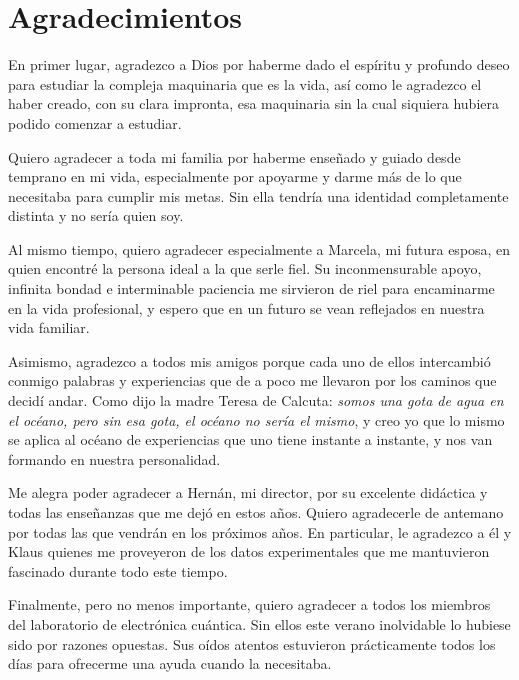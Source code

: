 \chapter*{Agradecimientos}

En primer lugar, agradezco a Dios por haberme dado el espíritu y profundo deseo para estudiar la compleja maquinaria que es la vida, así como le agradezco el haber creado, con su clara impronta, esa maquinaria sin la cual siquiera hubiera podido comenzar a estudiar.

Quiero agradecer a toda mi familia por haberme enseñado y guiado desde temprano en mi vida, especialmente por apoyarme y darme más de lo que necesitaba para cumplir mis metas. Sin ella tendría una identidad completamente distinta y no sería quien soy. 

Al mismo tiempo, quiero agradecer especialmente a Marcela, mi futura esposa, en quien encontré la persona ideal a la que serle fiel. Su inconmensurable apoyo, infinita bondad e interminable paciencia me sirvieron de riel para encaminarme en la vida profesional, y espero que en un futuro se vean reflejados en nuestra vida familiar.

Asimismo, agradezco a todos mis amigos porque cada uno de ellos intercambió conmigo palabras y experiencias que de a poco me llevaron por los caminos que decidí andar. Como dijo la madre Teresa de Calcuta: \textit{somos una gota de agua en el océano, pero sin esa gota, el océano no sería el mismo}, y creo yo que lo mismo se aplica al océano de experiencias que uno tiene instante a instante, y nos van formando en nuestra personalidad.

Me alegra poder agradecer a Hernán, mi director, por su excelente didáctica y todas las enseñanzas que me dejó en estos años. Quiero agradecerle de antemano por todas las que vendrán en los próximos años. En particular, le agradezco a él y Klaus quienes me proveyeron de los datos experimentales que me mantuvieron fascinado durante todo este tiempo.

Finalmente, pero no menos importante, quiero agradecer a todos los miembros del laboratorio de electrónica cuántica. Sin ellos este verano inolvidable lo hubiese sido por razones opuestas. Sus oídos atentos estuvieron prácticamente todos los días para ofrecerme una ayuda cuando la necesitaba.

